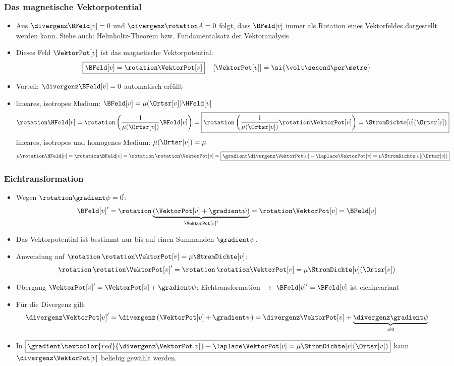 \begin{frame}
  \frametitle{Das magnetische Vektorpotential}
  \begin{itemize}[<+->]
  \item Aus \(\divergenz \BFeld[v] = 0 \) und $\divergenz\rotation \vec{A} = 0$ folgt, dass $\BFeld[v]$ immer als \alert{Rotation eines Vektorfeldes} dargestellt werden kann. Siehe auch: \alert{Helmholtz-Theorem} bzw. \alert{Fundamentalsatz der Vektoranalysis}
  \item Dieses Feld $\VektorPot[v]$ ist das \alert{magnetische Vektorpotential}:
    $$
    \boxed{\BFeld[v] = \rotation \VektorPot[v]} \quad \left[ \VektorPot[v] \right] = \si{\volt\second\per\metre}
    $$
    \item Vorteil: $\divergenz \BFeld[v] = 0$ automatisch erfüllt
  \item lineares, isotropes Medium: \(\BFeld[v] = \mu(\Ortsr[v])\HFeld[v] \)
    $$
    \rotation \HFeld[v] = \rotation\left( \dfrac{1}{\mu(\Ortsr[v])}  \BFeld[v] \right) = \boxed{\rotation\left( \dfrac{1}{\mu(\Ortsr[v])} \rotation \VektorPot[v] \right) = \StromDichte[v](\Ortsr[v])}
    $$
    lineares, isotropes und homogenes Medium: \(\mu(\Ortsr[v]) = \mu \)
    $$
    \mu \rotation \HFeld[v] = \rotation \BFeld[v] = \rotation \, \rotation \VektorPot[v] = \boxed{\gradient\divergenz \VektorPot[v] - \laplace \VektorPot[v]= \mu \StromDichte[v](\Ortsr[v])}
    $$
  \end{itemize}
\end{frame}


\begin{frame}
  \frametitle{Eichtransformation}
  \begin{itemize}[<+->]
\item Wegen $\rotation\gradient\psi =\vec{0}$:
      $$
    \BFeld[v]' = \rotation \underbrace{\left(\VektorPot[v] + \gradient\psi\right)}_{\VektorPot[v]'} = \rotation \VektorPot[v] = \BFeld[v]  
    $$
  \item Das Vektorpotential ist bestimmt nur bis auf einen Summanden $\gradient\psi$.
  \item Anwendung auf $\rotation \, \rotation \VektorPot[v] = \mu \StromDichte[v]$:
    $$
    \rotation \, \rotation \VektorPot[v]' = \rotation \, \rotation \VektorPot[v] = \mu \StromDichte[v](\Ortsr[v])  
    $$
  \item Übergang $\VektorPot[v]' = \VektorPot[v] + \gradient\psi$: \alert{Eichtransformation} $\to$ $\BFeld[v]'=\BFeld[v]$ ist \alert{eichinvariant}
  \item Für die Divergenz gilt:
    $$
    \divergenz \VektorPot[v]' = \divergenz\left(\VektorPot[v] + \gradient\psi \right) = \divergenz\VektorPot[v] + \underbrace{\divergenz \gradient\psi}_{\ne 0}
    $$
    \item In $\boxed{\gradient\textcolor{red}{\divergenz \VektorPot[v]} - \laplace \VektorPot[v]= \mu \StromDichte[v](\Ortsr[v])}$ kann $\divergenz \VektorPot[v]$ \alert{beliebig} gewählt werden. 
  \end{itemize}
\end{frame}

